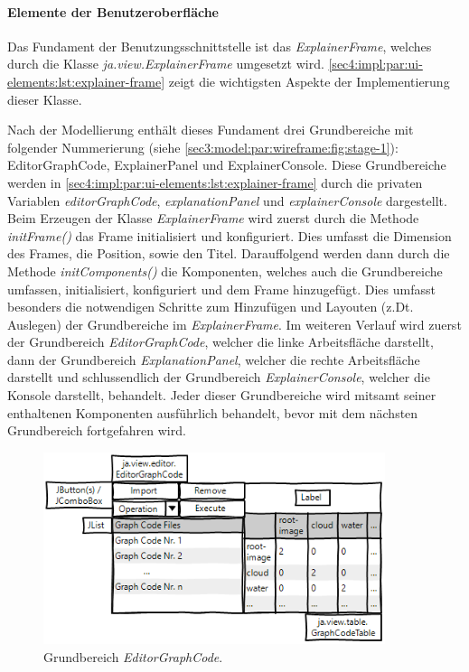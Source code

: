\paragraph{Elemente der Benutzeroberfläche}
\label{sec4:impl:par:ui-elements}

Das Fundament der Benutzungsschnittstelle ist das \textit{ExplainerFrame}, welches durch die Klasse \textit{ja.view.ExplainerFrame} umgesetzt wird.
\cref{sec4:impl:par:ui-elements:lst:explainer-frame} zeigt die wichtigsten Aspekte der Implementierung dieser Klasse.



Nach der Modellierung enthält dieses Fundament drei Grundbereiche mit folgender Nummerierung (siehe \cref{sec3:model:par:wireframe:fig:stage-1}):  EditorGraphCode,  ExplainerPanel und  ExplainerConsole.
Diese Grundbereiche werden in \cref{sec4:impl:par:ui-elements:lst:explainer-frame} durch die privaten Variablen \textit{editorGraphCode}, \textit{explanationPanel} und \textit{explainerConsole} dargestellt.
Beim Erzeugen der Klasse \textit{ExplainerFrame} wird zuerst durch die Methode \textit{initFrame()} das Frame initialisiert und konfiguriert.
Dies umfasst die Dimension des Frames, die Position, sowie den Titel.
Darauffolgend werden dann durch die Methode \textit{initComponents()} die Komponenten, welches auch die Grundbereiche umfassen, initialisiert, konfiguriert und dem Frame hinzugefügt.
Dies umfasst besonders die notwendigen Schritte zum Hinzufügen und Layouten (z.Dt. Auslegen) der Grundbereiche im \textit{ExplainerFrame}.
Im weiteren Verlauf wird zuerst der Grundbereich \textit{EditorGraphCode}, welcher die linke Arbeitsfläche darstellt, dann der Grundbereich \textit{ExplanationPanel}, welcher die rechte Arbeitsfläche darstellt und schlussendlich der Grundbereich \textit{ExplainerConsole}, welcher die Konsole darstellt, behandelt.
Jeder dieser Grundbereiche wird mitsamt seiner enthaltenen Komponenten ausführlich behandelt, bevor mit dem nächsten Grundbereich fortgefahren wird.

\begin{figure}[!ht]
  \includegraphics[width=10cm]{chapter/chapter_4/wireframe-impl-left}
  \caption{Grundbereich \textit{EditorGraphCode}.}
  \label{sec4:impl:subsubsec:ui:fig:wireframe-editor-graph-code}
\end{figure}

